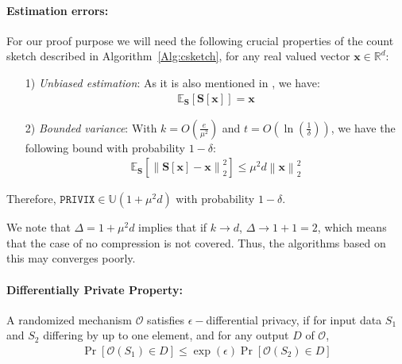 \paragraph{Estimation errors:}

\begin{property}
For our proof purpose we will need the following crucial properties of the count sketch described in Algorithm~\ref{Alg:csketch}, for any real valued vector $\mathbf{x}\in \mathbb{R}^{d}$:
\begin{itemize}
    \item[1)] \emph{Unbiased estimation}: As it is also mentioned in \cite{li2019privacy}, we have:
    \begin{align}
        \mathbb{E}_{\mathbf{S}}\left[\mathbf{S}\left[\mathbf{x}\right]\right]=\mathbf{x}
    \end{align}
    
    \item[2)] \emph{Bounded variance}: With $k=O\left(\frac{e}{\mu^2}\right)$ and $t=O\left(\ln \left(\frac{1}{\delta}\right)\right)$, we have the following bound with probability $1-\delta$:
    \begin{align}
        \mathbb{E}_{\mathbf{S}}\left[\left\|\mathbf{S}\left[\mathbf{x}\right]-\mathbf{x}\right\|_2^2\right]\leq \mu^2 d\left\|\mathbf{x}\right\|_2^2
    \end{align}
\end{itemize}
\end{property}
Therefore, $\texttt{PRIVIX}\in \mathbb{U}(1+\mu^2 d)$ with probability $1-\delta$.
\begin{remark}
We note that $\Delta=1+\mu^2d$ implies that if $k\rightarrow d$, $\Delta\rightarrow 1+1=2$, which means that the case of no compression is not covered. Thus, the algorithms based on this may converges poorly.
\end{remark}

\paragraph{Differentially Private Property:}
\begin{definition}
A randomized mechanism $\mathcal{O}$ satisfies $\epsilon-$differential privacy, if for input data ${S}_1$ and ${S}_2$ differing by up to one element, and for any output $D$ of $\mathcal{O}$,
\begin{align}
    \Pr\left[\mathcal{O}(S_1)\in D\right]\leq \exp{\left(\epsilon\right)}\Pr\left[\mathcal{O}(S_2)\in D\right] 
\end{align}
\end{definition}

